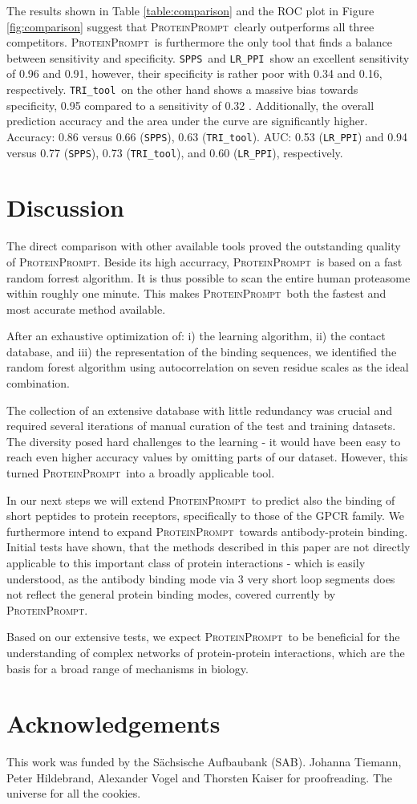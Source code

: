 \documentclass[3p,times,twocolumn]{elsarticle}
\newcommand{\spps}{\texttt{SPPS}}
\newcommand{\tri}{\texttt{TRI\_tool}}
\newcommand{\lr}{\texttt{LR\_PPI}}
\newcommand{\tool}{\textsc{ProteinPrompt}}
\begin{document}
The results shown in Table \ref{table:comparison} and the ROC plot in
Figure \ref{fig:comparison} suggest that \tool\  clearly outperforms all
three competitors. \tool\  is furthermore the only tool that finds a
balance between sensitivity and specificity. \spps\ and \lr\ show an
excellent sensitivity of 0.96 and 0.91, however, their
specificity is rather poor with 0.34 and 0.16, respectively. \tri\ on
the other hand shows a massive bias towards specificity, 0.95 compared
to a sensitivity of 0.32 .
Additionally, the overall prediction accuracy and the area under the curve are significantly higher.
Accuracy: 0.86 versus 0.66 (\spps), 0.63 (\tri).
AUC: 0.53 (\lr) and 0.94 versus 0.77 (\spps), 0.73 (\tri), and 0.60 (\lr), respectively.


\section{Discussion}

The direct comparison with other available tools
proved the outstanding quality of \tool.
Beside its high accurracy, \tool\ is based on a fast random forrest algorithm.
It is thus possible to scan the entire human proteasome within roughly one minute.
This makes \tool\  both the fastest and most accurate method available. 

After an exhaustive optimization of: i) the learning algorithm, ii)
the contact database, and iii) the representation of the binding
sequences, we identified the random forest algorithm using autocorrelation on seven
residue scales as the ideal combination.

The collection of an extensive database with little redundancy was crucial
and required several iterations of manual curation of the test and training datasets.
The diversity posed hard challenges to the learning
- it would have been easy to reach even higher accuracy values by omitting parts of our dataset.
However, this turned \tool\ into a broadly applicable tool.

In our next steps we will extend \tool\  to predict also the binding of short peptides to protein receptors, specifically to those of the GPCR family.
We furthermore intend to expand \tool\  towards antibody-protein binding.
Initial tests have shown, that the methods described in this paper are not directly applicable to this important class of protein interactions - which is easily understood, as the antibody binding mode via 3 very short loop segments does not reflect the general protein binding modes, covered currently by \tool. 

Based on our extensive tests, we expect \tool\
to be beneficial for the understanding of complex networks of protein-protein interactions,
which are the basis for a broad range of mechanisms in biology.


\section*{Acknowledgements} This work was funded by the S\"achsische Aufbaubank (SAB).
Johanna Tiemann, Peter Hildebrand, Alexander Vogel and Thorsten Kaiser for proofreading.
The universe for all the cookies.



\end{document}
